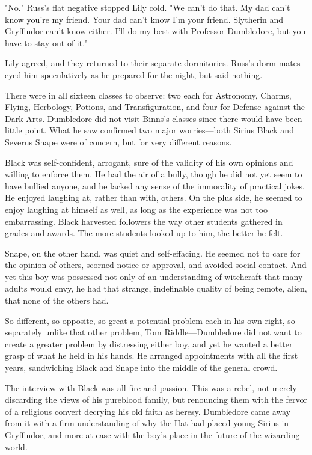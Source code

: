"No." Russ's flat negative stopped Lily cold. "We can't do that. My dad{\el} can't know you're my friend. Your dad can't know I'm your{\el} friend. Slytherin and Gryffindor can't know either. I'll do my{\el} best with Professor Dumbledore, but you have to stay out of it."

Lily agreed, and they returned to their separate dormitories. Russ's dorm mates eyed him speculatively as he prepared for the night, but said nothing.

There were in all sixteen classes to observe: two each for Astronomy, Charms, Flying, Herbology, Potions, and Transfiguration, and four for Defense against the Dark Arts. Dumbledore did not visit Binns's classes since there would have been little point. What he saw confirmed two major worries—both Sirius Black and Severus Snape were of concern, but for very different reasons.

Black was self-confident, arrogant, sure of the validity of his own opinions and willing to enforce them. He had the air of a bully, though he did not yet seem to have bullied anyone, and he lacked any sense of the immorality of practical jokes. He enjoyed laughing at, rather than with, others. On the plus side, he seemed to enjoy laughing at himself as well, as long as the experience was not too embarrassing. Black harvested followers the way other students gathered in grades and awards. The more students looked up to him, the better he felt.

Snape, on the other hand, was quiet and self-effacing. He seemed not to care for the opinion of others, scorned notice or approval, and avoided social contact. And yet this boy was possessed not only of an understanding of witchcraft that many adults would envy, he had that strange, indefinable quality of being remote, alien, that none of the others had.

So different, so opposite, so great a potential problem each in his own right, so separately unlike that other problem, Tom Riddle—Dumbledore did not want to create a greater problem by distressing either boy, and yet he wanted a better grasp of what he held in his hands. He arranged appointments with all the first years, sandwiching Black and Snape into the middle of the general crowd.

The interview with Black was all fire and passion. This was a rebel, not merely discarding the views of his pureblood family, but renouncing them with the fervor of a religious convert decrying his old faith as heresy. Dumbledore came away from it with a firm understanding of why the Hat had placed young Sirius in Gryffindor, and more at ease with the boy's place in the future of the wizarding world.


